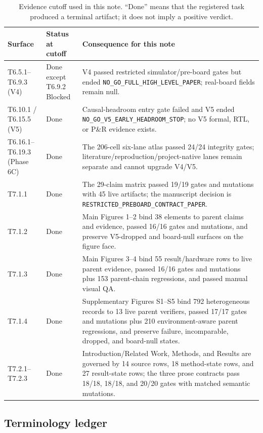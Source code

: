 \documentclass[11pt]{article}
\begin{document}
\begin{table}[htbp]
\centering
\small
\caption{Evidence cutoff used in this note.  ``Done'' means that the registered
task produced a terminal artifact; it does not imply a positive verdict.}
\label{tab:evidence-cutoff}
\begin{tabularx}{\textwidth}{@{}l l X@{}}
\toprule
Surface & Status at cutoff & Consequence for this note \\
\midrule
T6.5.1--T6.9.3 (V4) & Done except T6.9.2 Blocked & V4 passed restricted simulator/pre-board gates but ended \texttt{NO\_GO\_FULL\_HIGH\_LEVEL\_PAPER}; real-board fields remain null. \\
T6.10.1 / T6.15.5 (V5) & Done & Causal-headroom entry gate failed and V5 ended \texttt{NO\_GO\_V5\_EARLY\_HEADROOM\_STOP}; no V5 formal, RTL, or P\&R evidence exists. \\
T6.16.1--T6.19.3 (Phase 6C) & Done & The 206-cell six-lane atlas passed 24/24 integrity gates; literature/reproduction/project-native lanes remain separate and cannot upgrade V4/V5. \\
T7.1.1 & Done & The 29-claim matrix passed 19/19 gates and mutations with 45 live artifacts; the manuscript decision is \texttt{RESTRICTED\_PREBOARD\_CONTRACT\_PAPER}. \\
T7.1.2 & Done & Main Figures 1--2 bind 38 elements to parent claims and evidence, passed 16/16 gates and mutations, and preserve V5-dropped and board-null surfaces on the figure face. \\
T7.1.3 & Done & Main Figures 3--4 bind 55 result/hardware rows to live parent evidence, passed 16/16 gates and mutations plus 153 parent-chain regressions, and passed manual visual QA. \\
T7.1.4 & Done & Supplementary Figures S1--S5 bind 792 heterogeneous records to 13 live parent verifiers, passed 17/17 gates and mutations plus 210 environment-aware parent regressions, and preserve failure, incomparable, dropped, and board-null states. \\
T7.2.1--T7.2.3 & Done & Introduction/Related Work, Methods, and Results are governed by 14 source rows, 18 method-state rows, and 27 result-state rows; the three prose contracts pass 18/18, 18/18, and 20/20 gates with matched semantic mutations. \\
\bottomrule
\end{tabularx}
\end{table}

\subsection{Terminology ledger}
\end{document}
